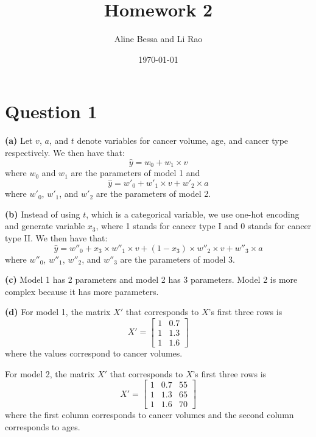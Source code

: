 \documentclass[leqno]{article}
\title{Homework 2}
\author{Aline Bessa and Li Rao}
\date\today
\begin{document}
\maketitle %

\section*{Question 1}

\textbf{(a)} Let $v$, $a$, and $t$ denote variables for cancer volume, age, and cancer type respectively. We then have that:
\begin{equation*}
\hat{y} = w_0 + w_1 \times v
\end{equation*}
where $w_0$ and $w_1$ are the parameters of model 1 and
\begin{equation*}
\hat{y} = w'_0 + w'_1 \times v + w'_2 \times a
\end{equation*}
where $w'_0$, $w'_1$, and $w'_2$ are the parameters of model 2.

\hfill

\textbf{(b)} Instead of using $t$, which is a categorical variable, we use one-hot encoding and generate variable $x_3$, where 1 stands for cancer type I and 
0 stands for cancer type II. We then have that:
\begin{equation*}
\hat{y} = w''_0 + x_3 \times w''_1 \times v + (1 - x_3) \times w''_2 \times v  + w''_3 \times a 
\end{equation*}
where $w''_0$, $w''_1$, $w''_2$, and $w''_3$ are the parameters of model 3.

\hfill

\textbf{(c)} Model 1 has 2 parameters and model 2 has 3 parameters. Model 2 is more complex because it has more parameters.

\hfill

\textbf{(d)} For model 1, the matrix $X'$ that corresponds to $X$'s first three rows is
\[
X'=
  \begin{bmatrix}
    1 & 0.7 \\
    1 & 1.3 \\
    1 & 1.6
  \end{bmatrix}
\]
where the values correspond to cancer volumes.

For model 2, the matrix $X'$ that corresponds to $X$'s first three rows is
\[
X'=
  \begin{bmatrix}
    1 & 0.7 & 55 \\
    1 & 1.3 & 65 \\
    1 & 1.6 & 70
  \end{bmatrix}
\]
where the first column corresponds to cancer volumes and the second column corresponds to ages.
\end{document}
